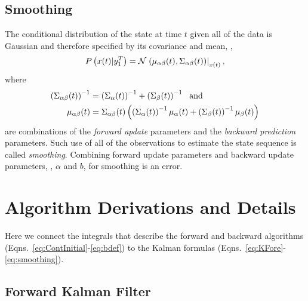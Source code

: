 \subsection{Smoothing}

The conditional distribution of the state at time $t$ given all of the
data is Gaussian and therefore specified by its covariance and mean, \ie,
\begin{equation*}
   P \left({x}{(t)}|y_{1}^{T} \right) = {\mathcal{N}}\left.\left({\mu_{\alpha
   \beta}}{(t)},{\Sigma_{\alpha \beta}}{(t)}\right)\right|_{{x}{(t)}},
\end{equation*}
where
\begin{subequations}
  \label{eq:smoothing}
  \begin{align}
    \left( {\Sigma_{\alpha \beta}}{(t)} \right)^{-1} &= \left(
      {\Sigma_{\alpha}}{(t)} \right)^{-1} + \left(
      {\Sigma_{\beta}}{(t)} \right)^{-1} ~\text{ and} \\
    {\mu_{\alpha \beta}}{(t)} &=
    {\Sigma_{\alpha \beta}}{(t)} \left( \left(
        {\Sigma_{\alpha}}{(t)} \right)^{-1} {\mu_{\alpha}}{(t)} +
      \left( {\Sigma_{\beta}}{(t)} \right)^{-1} {\mu_{\beta}}{(t)}
    \right)
\end{align}
\end{subequations}
are combinations of the \emph{forward update} parameters and the
\emph{backward prediction} parameters.  Such use of all of the
observations to estimate the state sequence is called
\emph{smoothing}.  Combining forward update parameters and backward
update parameters, \ie, $\alpha$ and $b$, for smoothing is an error.

\section{Algorithm Derivations and Details}
\label{sec:KDerive}

Here we connect the integrals that describe the forward and backward
algorithms (Eqns.~\eqref{eq:ContInitial}-\eqref{eq:bdef}) to the
Kalman formulas (Eqns.~\eqref{eq:KFore}-\eqref{eq:smoothing}).

\subsection{Forward Kalman Filter}
\label{sec:DetailForward}

